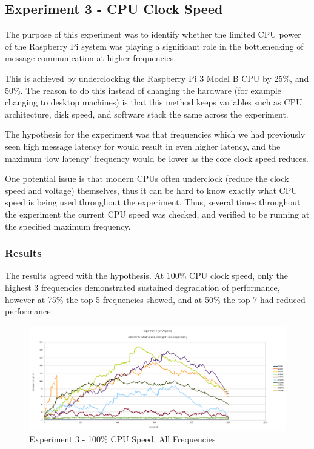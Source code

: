 \documentclass[../dissertation.tex]{subfiles}
\begin{document}
\subsection{Experiment 3 - CPU Clock Speed}
\label{experiment3-cpu-speed}

The purpose of this experiment was to identify whether the limited CPU power of the Raspberry Pi system was playing a significant role in the bottlenecking of message communication at higher frequencies.

This is achieved by underclocking the Raspberry Pi 3 Model B CPU by 25\%, and 50\%. The reason to do this instead of changing the hardware (for example changing to desktop machines) is that this method keeps variables such as CPU architecture, disk speed, and software stack the same across the experiment.

The hypothesis for the experiment was that frequencies which we had previously seen high message latency for would result in even higher latency, and the maximum `low latency' frequency would be lower as the core clock speed reduces.

One potential issue is that modern CPUs often underclock (reduce the clock speed and voltage) themselves, thus it can be hard to know exactly what CPU speed is being used throughout the experiment. Thus, several times throughout the experiment the current CPU speed was checked, and verified to be running at the specified maximum frequency.

\subsubsection{Results}

The results agreed with the hypothesis. At 100\% CPU clock speed, only the highest 3 frequencies demonstrated sustained degradation of performance, however at 75\% the top 5 frequencies showed, and at 50\% the top 7 had reduced performance.

\begin{figure}[H]
\centering
\includegraphics[width=\textwidth]{images/experiment3/50_clockspeed_mean_values_by_freq_pretty.png}
\caption{Experiment 3 - 100\% CPU Speed, All Frequencies}
\label{exp3-cpu100}
\end{figure}
\end{document}
